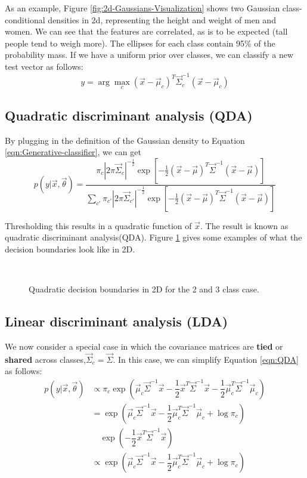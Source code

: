As an example, Figure \ref{fig:2d-Gaussians-Visualization} shows two Gaussian class-conditional densities in 2d, representing the height and weight of men and women. We can see that the features are correlated, as is to be expected (tall people tend to weigh more). The ellipses for each class contain 95\% of the probability mass. If we have a uniform prior over classes, we can classify a new test vector as follows:
\begin{equation}
y=\arg\max_{c} (\vec{x}-\vec{\mu}_c)^T\vec{\Sigma}_c^{-1}(\vec{x}-\vec{\mu}_c)
\end{equation}


\subsection{Quadratic discriminant analysis (QDA)}
By plugging in the definition of the Gaussian density to Equation \ref{eqn:Generative-classifier}, we can get
\begin{equation}\label{eqn:QDA}
p(y|\vec{x},\vec{\theta})=\dfrac{\pi_c|2\pi\vec{\Sigma}_c|^{-\frac{1}{2}}\exp\left[-\frac{1}{2}(\vec{x}-\vec{\mu})^T\vec{\Sigma}^{-1}(\vec{x}-\vec{\mu})\right]}{\sum_{c'}\pi_{c'}|2\pi\vec{\Sigma}_{c'}|^{-\frac{1}{2}}\exp\left[-\frac{1}{2}(\vec{x}-\vec{\mu})^T\vec{\Sigma}^{-1}(\vec{x}-\vec{\mu})\right]}
\end{equation}

Thresholding this results in a quadratic function of $\vec{x}$. The result is known as quadratic discriminant analysis(QDA). Figure \ref{fig:QDA} gives some examples of what the decision boundaries look like in 2D.

\begin{figure}[hbtp]
\centering
{} \\
\caption{Quadratic decision boundaries in 2D for the 2 and 3 class case.}
\label{fig:QDA} 
\end{figure}


\subsection{Linear discriminant analysis (LDA)}
\label{sec:Linear-discriminant-analysis}
We now consider a special case in which the covariance matrices are \textbf{tied} or \textbf{shared} across classes,$\vec{\Sigma}_c=\vec{\Sigma}$. In this case, we can simplify Equation \ref{eqn:QDA} as follows:
\begin{align}
p(y|\vec{x},\vec{\theta})& \propto \pi_c\exp\left(\vec{\mu}_c\vec{\Sigma}^{-1}\vec{x}-\dfrac{1}{2}\vec{x}^T\vec{\Sigma}^{-1}\vec{x}-\dfrac{1}{2}\vec{\mu}_c^T\vec{\Sigma}^{-1}\vec{\mu}_c\right) \nonumber \\
 & =\exp\left(\vec{\mu}_c\vec{\Sigma}^{-1}\vec{x}-\dfrac{1}{2}\vec{\mu}_c^T\vec{\Sigma}^{-1}\vec{\mu}_c+\log \pi_c\right) \nonumber \\
 & \quad \exp\left(-\dfrac{1}{2}\vec{x}^T\vec{\Sigma}^{-1}\vec{x}\right) \nonumber \\
 & \propto \exp\left(\vec{\mu}_c\vec{\Sigma}^{-1}\vec{x}-\dfrac{1}{2}\vec{\mu}_c^T\vec{\Sigma}^{-1}\vec{\mu}_c+\log \pi_c\right)
\end{align}

